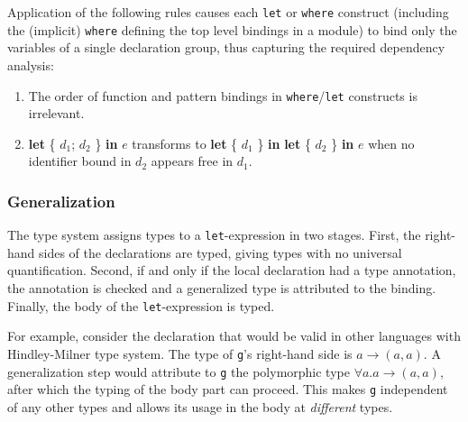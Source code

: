 Application of the following rules causes each \texttt{let} or \texttt{where} construct (including the (implicit) \texttt{where} defining the top level bindings in a module) to bind only the variables of a single declaration group, thus capturing the required dependency analysis:

\begin{enumerate}
\item The order of function and pattern bindings in \texttt{where}/\texttt{let} constructs is irrelevant.
\item \textbf{let} \{ $d_1$; $d_2$ \} \textbf{in} $e$ transforms to \textbf{let} \{ $d_1$  \} \textbf{in} \textbf{let} \{ $d_2$ \} \textbf{in} $e$ when no identifier bound in $d_2$ appears free in $d_1$.
\end{enumerate}

\subsubsection{Generalization} \label{generalization}

The type system assigns types to a \texttt{let}-expression in two stages.
First, the right-hand sides of the declarations are typed, giving types with no universal quantification.
Second, if and only if the local declaration had a type annotation, the annotation is checked and a generalized type is attributed to the binding.
Finally, the body of the \texttt{let}-expression is typed.


For example, consider the declaration 
that would be valid in other languages with Hindley-Milner type system.
The type of \texttt{g}'s right-hand side is $a \rightarrow{} (a,a)$. A generalization step would attribute to \texttt{g} the polymorphic type $\forall a. a \rightarrow{} (a,a)$, after which the typing of the body part can proceed. This makes \texttt{g} independent of any other types and allows its usage in the body at \emph{different} types.


